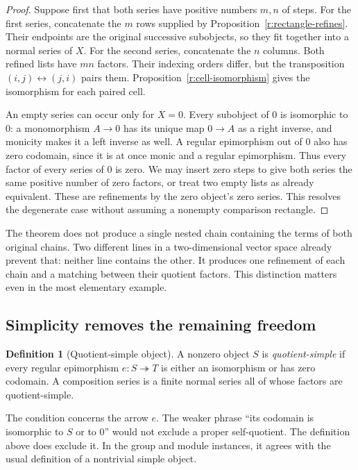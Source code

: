 \documentclass[11pt]{article}
\theoremstyle{definition}
\newtheorem{definition}[theorem]{Definition}
\theoremstyle{remark}\newtheorem{remark}[theorem]{Remark}
\begin{document}
\begin{proof}
Suppose first that both series have positive numbers $m,n$ of steps.
For the first series, concatenate the $m$ rows supplied by
Proposition~\ref{r:rectangle-refines}.  Their endpoints are the original
successive subobjects, so they fit together into a normal series of $X$.
For the second series, concatenate the $n$ columns.  Both refined lists
have $mn$ factors.  Their indexing orders differ, but the transposition
$(i,j)\leftrightarrow(j,i)$ pairs them.  Proposition~\ref{r:cell-isomorphism}
gives the isomorphism for each paired cell.

An empty series can occur only for $X=0$.  Every subobject of $0$ is
isomorphic to $0$: a monomorphism $A\to0$ has its unique map $0\to A$ as
a right inverse, and monicity makes it a left inverse as well.  A regular
epimorphism out of $0$ also has zero codomain, since it is at once monic
and a regular epimorphism.  Thus every factor of every series of $0$ is
zero.  We may insert zero steps to give both series the same positive
number of zero factors, or treat two empty lists as already equivalent.
These are refinements by the zero object's zero series.  This resolves
the degenerate case without assuming a nonempty comparison rectangle.
\end{proof}

The theorem does not produce a single nested chain containing the terms
of both original chains.  Two different lines in a two-dimensional vector
space already prevent that: neither line contains the other.  It produces
one refinement of each chain and a matching between their quotient
factors.  This distinction matters even in the most elementary example.

\subsection{Simplicity removes the remaining freedom}

\begin{definition}[Quotient-simple object]
\label{j:simple}
A nonzero object $S$ is \emph{quotient-simple} if every regular
epimorphism $e:S\twoheadrightarrow T$ is either an isomorphism or has
zero codomain.  A composition series is a finite normal series all of
whose factors are quotient-simple.
\end{definition}

The condition concerns the arrow $e$.  The weaker phrase ``its codomain
is isomorphic to $S$ or to $0$'' would not exclude a proper self-quotient.
The definition above does exclude it.  In the group and module instances,
it agrees with the usual definition of a nontrivial simple object.
\end{document}
